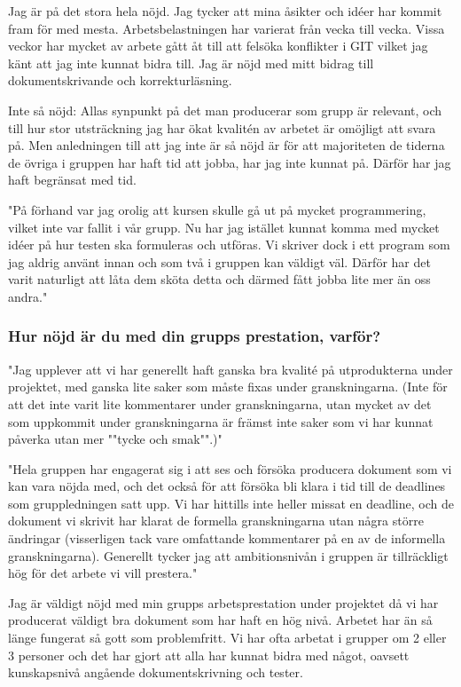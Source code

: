 \documentclass[a4paper]{article}
\begin{document}
Jag är på det stora hela nöjd. Jag tycker att mina åsikter och idéer har kommit fram för med mesta. Arbetsbelastningen har varierat från vecka till vecka. Vissa veckor har mycket av arbete gått åt till att felsöka konflikter i GIT vilket jag känt att jag inte kunnat bidra till. Jag är nöjd med mitt bidrag till dokumentskrivande och korrekturläsning. 

Inte så nöjd: Allas synpunkt på det man producerar som grupp är relevant, och till hur stor utsträckning jag har ökat kvalitén av arbetet är omöjligt att svara på. Men anledningen till att jag inte är så nöjd är för att majoriteten de tiderna de övriga i gruppen har haft tid att jobba, har jag inte kunnat på. Därför har jag haft begränsat med tid. 

"På förhand var jag orolig att kursen skulle gå ut på mycket programmering, vilket inte var fallit i vår grupp. Nu har jag istället kunnat komma med mycket idéer på hur testen ska formuleras och utföras. 
Vi skriver dock i ett program som jag aldrig använt innan och som två i gruppen kan väldigt väl. Därför har det varit naturligt att låta dem sköta detta och därmed fått jobba lite mer än oss andra."


\subsubsection{Hur nöjd är du med din grupps prestation, varför?}
"Jag upplever att vi har generellt haft ganska bra kvalité på utprodukterna under projektet, med ganska lite saker som måste fixas under granskningarna.
(Inte för att det inte varit lite kommentarer under granskningarna, utan mycket av det som uppkommit under granskningarna är främst inte saker som vi har kunnat påverka utan mer ""tycke och smak"".)"

"Hela gruppen har engagerat sig i att ses och försöka producera dokument som vi kan vara nöjda med, och det också för att försöka bli klara i tid till de deadlines som gruppledningen satt upp. Vi har hittills inte heller missat en deadline, och de dokument vi skrivit har klarat de formella granskningarna utan några större ändringar (visserligen tack vare omfattande kommentarer på en av de informella granskningarna).
Generellt tycker jag att ambitionsnivån i gruppen är tillräckligt hög för det arbete vi vill prestera."

Jag är väldigt nöjd med min grupps arbetsprestation under projektet då vi har producerat väldigt bra dokument som har haft en hög nivå. Arbetet har än så länge fungerat så gott som problemfritt. Vi har ofta arbetat i grupper om 2 eller 3 personer och det har gjort att alla har kunnat bidra med något, oavsett kunskapsnivå angående dokumentskrivning och tester. 
\end{document}
